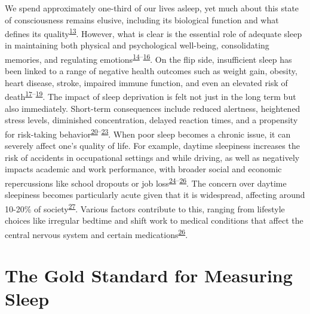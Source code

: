 \documentclass[
  9pt,
]{scrbook}
\begin{document}
We spend approximately one-third of our lives asleep, yet much about
this state of consciousness remains elusive, including its biological
function and what defines its
quality\textsuperscript{\protect\hyperlink{ref-ma_sleep_2017}{13}}.
However, what is clear is the essential role of adequate sleep in
maintaining both physical and psychological well-being, consolidating
memories, and regulating
emotions\textsuperscript{\protect\hyperlink{ref-worley_2018}{14}--\protect\hyperlink{ref-scott_2021}{16}}.
On the flip side, insufficient sleep has been linked to a range of
negative health outcomes such as weight gain, obesity, heart disease,
stroke, impaired immune function, and even an elevated risk of
death\textsuperscript{\protect\hyperlink{ref-consensus_conference_panel_recommended_2015}{17}--\protect\hyperlink{ref-hale_2020}{19}}.
The impact of sleep deprivation is felt not just in the long term but
also immediately. Short-term consequences include reduced alertness,
heightened stress levels, diminished concentration, delayed reaction
times, and a propensity for risk-taking
behavior\textsuperscript{\protect\hyperlink{ref-shochat_2014}{20}--\protect\hyperlink{ref-bonnet_1985}{23}}.
When poor sleep becomes a chronic issue, it can severely affect one's
quality of life. For example, daytime sleepiness increases the risk of
accidents in occupational settings and while driving, as well as
negatively impacts academic and work performance, with broader social
and economic repercussions like school dropouts or job
loss\textsuperscript{\protect\hyperlink{ref-connor_2002}{24}--\protect\hyperlink{ref-roth_1996}{26}}.
The concern over daytime sleepiness becomes particularly acute given
that it is widespread, affecting around 10-20\% of
society\textsuperscript{\protect\hyperlink{ref-wang_2019}{27}}. Various
factors contribute to this, ranging from lifestyle choices like
irregular bedtime and shift work to medical conditions that affect the
central nervous system and certain
medications\textsuperscript{\protect\hyperlink{ref-roth_1996}{26}}.

\hypertarget{the-gold-standard-for-measuring-sleep}{%
\section{The Gold Standard for Measuring
Sleep}\label{the-gold-standard-for-measuring-sleep}}
\end{document}
